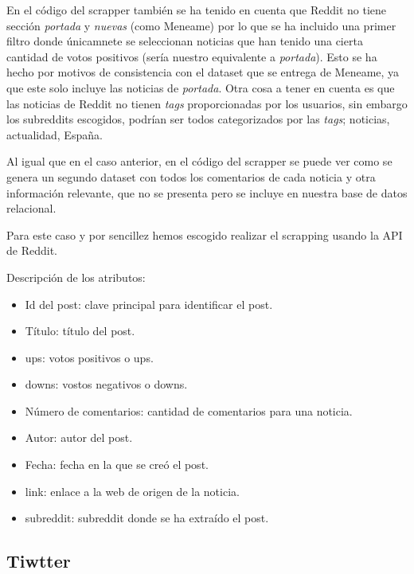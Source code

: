\documentclass[a4paper,12pt]{article}
\begin{document}
En el c\'odigo del scrapper tambi\'en se ha tenido en cuenta que Reddit no tiene secci\'on {\itshape portada} y {\itshape nuevas} (como Meneame) por lo que se ha incluido una primer filtro donde \'unicamnete se seleccionan noticias que han tenido una cierta cantidad de votos positivos (ser\'ia nuestro equivalente a {\itshape portada}). Esto se ha hecho por motivos de consistencia con el dataset que se entrega de Meneame, ya que este solo incluye las noticias de {\itshape portada}. Otra cosa a tener en cuenta es que las noticias de Reddit no tienen {\itshape tags} proporcionadas por los usuarios, sin embargo los subreddits escogidos, podr\'ian ser todos categorizados por las {\itshape tags}; noticias, actualidad, Espa\~na.

Al igual que en el caso anterior, en el c\'odigo del scrapper se puede ver como se genera un segundo dataset con todos los comentarios de cada noticia y otra informaci\'on relevante, que no se presenta pero se incluye en nuestra base de datos relacional.  

Para este caso y por sencillez hemos escogido realizar el scrapping usando la API de Reddit.


Descripci\'on de los atributos:

\begin{itemize}

\item Id del post: clave principal para identificar el post.

\item T\'itulo: t\'itulo del post.

\item ups: votos  positivos o ups.

\item downs: vostos negativos o downs.

\item N\'umero de comentarios: cantidad de comentarios para una noticia.

\item Autor: autor del post.

\item Fecha: fecha en la que se cre\'o el post.

\item link: enlace a la web de origen de la noticia.

\item subreddit: subreddit donde se ha extra\'ido el post.
\end{itemize}


\subsection{Tiwtter}
\end{document}
